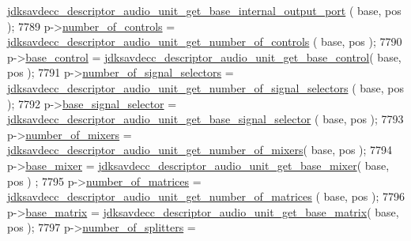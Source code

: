 \begin{DoxyCode}
      \hyperlink{group__descriptor__audio_ga6b0b0324ff6e4bb78babe7c0dc305e60}{jdksavdecc\_descriptor\_audio\_unit\_get\_base\_internal\_output\_port}
      ( base, pos );
7789         p->\hyperlink{structjdksavdecc__descriptor__audio__unit_a0104bea638bdadf1a547c2b93813e22f}{number\_of\_controls} = 
      \hyperlink{group__descriptor__audio_gad33aa5ef5f5e9f0db7d89afd6e820ff5}{jdksavdecc\_descriptor\_audio\_unit\_get\_number\_of\_controls}
      ( base, pos );
7790         p->\hyperlink{structjdksavdecc__descriptor__audio__unit_af06eac7dd98377a85258308e8a25e7f2}{base\_control} = 
      \hyperlink{group__descriptor__audio_ga440b65f044454a6b9e4fb0a4144c58b2}{jdksavdecc\_descriptor\_audio\_unit\_get\_base\_control}( base, 
      pos );
7791         p->\hyperlink{structjdksavdecc__descriptor__audio__unit_af062758f302e01b8b7b7bd84cdb15806}{number\_of\_signal\_selectors} = 
      \hyperlink{group__descriptor__audio_ga5f9fad0e6cd76c2df383ae7ed608875c}{jdksavdecc\_descriptor\_audio\_unit\_get\_number\_of\_signal\_selectors}
      ( base, pos );
7792         p->\hyperlink{structjdksavdecc__descriptor__audio__unit_a5bd998af8a76ae1336006ec16829b64d}{base\_signal\_selector} = 
      \hyperlink{group__descriptor__audio_ga328bab081bcc637cf7cd4bac37d0dbc4}{jdksavdecc\_descriptor\_audio\_unit\_get\_base\_signal\_selector}
      ( base, pos );
7793         p->\hyperlink{structjdksavdecc__descriptor__audio__unit_a6d06803f27b9635d1fb276aa4d4a070b}{number\_of\_mixers} = 
      \hyperlink{group__descriptor__audio_gacb82e38b2002768ec8acf63cea9374ab}{jdksavdecc\_descriptor\_audio\_unit\_get\_number\_of\_mixers}(
       base, pos );
7794         p->\hyperlink{structjdksavdecc__descriptor__audio__unit_ad2cbeba461f7e25ffee9118ab1343ee0}{base\_mixer} = 
      \hyperlink{group__descriptor__audio_gacdf66ebbeec1e83e48d843ea97267a66}{jdksavdecc\_descriptor\_audio\_unit\_get\_base\_mixer}( base, pos )
      ;
7795         p->\hyperlink{structjdksavdecc__descriptor__audio__unit_a0c19f1b0409a0cdaaf557f4a7a717260}{number\_of\_matrices} = 
      \hyperlink{group__descriptor__audio_ga7f48988c4ac098e49e1f7ae439f31628}{jdksavdecc\_descriptor\_audio\_unit\_get\_number\_of\_matrices}
      ( base, pos );
7796         p->\hyperlink{structjdksavdecc__descriptor__audio__unit_a4faf17fd3b3d91f6b24fe8d66a042309}{base\_matrix} = 
      \hyperlink{group__descriptor__audio_gaaa0540f5e8e411442d5bc4c138db7435}{jdksavdecc\_descriptor\_audio\_unit\_get\_base\_matrix}( base, pos
       );
7797         p->\hyperlink{structjdksavdecc__descriptor__audio__unit_a3b40548ad0ea8b330660dcee0de42db7}{number\_of\_splitters} = 

\end{DoxyCode}
